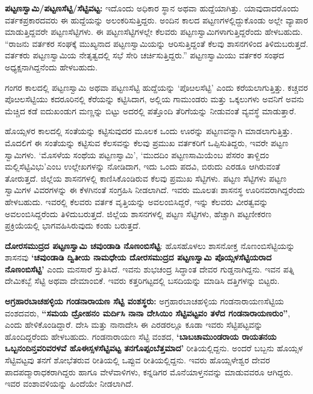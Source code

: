 \textbf{ಪಟ್ಟಣಸ್ವಾಮಿ/ಪಟ್ಟಣಸೆಟ್ಟಿ/ಸೆಟ್ಟಿವಟ್ಟ: } ಇದೊಂದು ಅಧಿಕಾರ ಸ್ಥಾನ ಅಥವಾ ಹುದ್ದೆಯಾಗಿತ್ತು. ಯಾವುದಾದ\-ರೊಂದು ವರ್ತಕಪ್ರಕಾರದವರು ಈ ಹುದ್ದೆಯನ್ನು ಅಲಂಕರಿಸುತ್ತಿದ್ದರು. ಅಂದಿನ ಕಾಲದ ಪಟ್ಟಣಗಳಲ್ಲಿದ್ದುಕೊಂಡು ಅಲ್ಲೇ ವ್ಯಾಪಾರ ಮಾಡುತ್ತಿದ್ದವರೇ ಪಟ್ಟಣಸೆಟ್ಟಿಗಳು. ಈ ಪಟ್ಟಣಸೆಟ್ಟಿಗಳಲ್ಲೇ ಕೆಲವರು ಪಟ್ಟಣಸ್ವಾಮಿಗಳಾಗುತ್ತಿದ್ದರೆಂದು ಹೇಳಬಹುದು. “ರಾಜನು ವರ್ತಕರ ಸಂಘಕ್ಕೆ ಮುಖ್ಯನಾದ ಪಟ್ಟಣಸ್ವಾಮಿಯನ್ನು ಆರಿಸುತ್ತಿದ್ದಂತೆ ಕೆಲವು ಶಾಸನಗಳಿಂದ ತಿಳಿದುಬರುತ್ತದೆ. ವರ್ತಕರು ಪಟ್ಟಣಸ್ವಾಮಿಯ ನೇತೃತ್ವದಲ್ಲಿ ಸಭೆ ಸೇರಿ ಚರ್ಚಿಸುತ್ತಿದ್ದರು.” ಪಟ್ಟಣಸ್ವಾಮಿಯು ವರ್ತಕರ ಸಂಘದ ಅಧ್ಯಕ್ಷನಾಗಿದ್ದನೆಂದು ಹೇಳಬಹುದು.

ಗಂಗರ ಕಾಲದಲ್ಲಿ ಪಟ್ಟಣಸ್ವಾಮಿ ಅಥವಾ ಪಟ್ಟಣಸೆಟ್ಟಿ ಹುದ್ದೆಯನ್ನು ‘ಪೊೞಲಸೆಟ್ಟಿ’ ಎಂದು ಕರೆಯಲಾಗುತ್ತಿತ್ತು. ಕಚ್ಚವರ ಪೊೞಲಸೆಟ್ಟಿಯು ಕದರೂರಿನಲ್ಲಿ ಕೆರೆಯನ್ನು ಕಟ್ಟಿಸಿದಾಗ, ಅಲ್ಲಿಯ ಗಾಮುಂಡರು ಮತ್ತು ಒಕ್ಕಲುಗಳು ಅವನಿಗೆ ಅವನು ಮೆಚ್ಚಿದ ಕಡೆ ಐದುಖಂಡುಗ ಮಣ್ಣನ್ನು ಬಿಟ್ಟು ಅದರಲ್ಲಿ ಪತ್ತೊಂದಿ ತೆರಿಗೆಯನ್ನು ನೀಡುವಂತೆ ವ್ಯವಸ್ಥೆ ಮಾಡುತ್ತಾರೆ.

ಹೊಯ್ಸಳರ ಕಾಲದಲ್ಲಿ ಸಂತೆಯನ್ನು ಕಟ್ಟಿಸುವುದರ ಮೂಲಕ ಒಂದು ಊರನ್ನು ಪಟ್ಟಣವನ್ನಾಗಿ ಮಾಡಲಾಗುತ್ತಿತ್ತು. ಮೊದಲಿಗೆ ಈ ಸಂತೆಯನ್ನು ಕಟ್ಟಿಸುವ ಕೆಲಸವನ್ನು ಕೆಲವು ಪ್ರಮುಖ ವರ್ತಕರಿಗೆ ಒಪ್ಪಿಸುತಿದ್ದರು, ಇವರೇ ಪಟ್ಟಣ ಸ್ವಾಮಿಗಳು. ‘ಮೊಸಳೆಯ ಸಂಥೆಯ ಪಟ್ಟಣಸ್ವಾಮಿ’, ‘ಮುದದಿಂ ಪಟ್ಟಣಸಾಮಿಯೆಂಬ ಪೆಸರಂ ತಾಳ್ದಿದಂ ಮಲ್ಲಿಸೆಟ್ಟಿವಿಭು’ಎಂಬ ಉಲ್ಲೇಖಗಳನ್ನು ನೋಡಿದಾಗ, ಇದು ಒಂದು ಪದವಿ, ಬಿರುದು ಎರಡೂ ಆಗಿರುವಂತೆ ತೋರುತ್ತದೆ. ಜಿಲ್ಲೆಯ ಶಾಸನಗಳಲ್ಲಿ ಕಾಣಿಸಿಕೊಂಡಿರುವ ಕೆಲವು ಪ್ರಮುಖ ಸೆಟ್ಟಿಗಳು. ಪಟ್ಟಣ ಸೆಟ್ಟಿಗಳು ಪಟ್ಟಣ ಸ್ವಾಮಿಗಳ ವಿವರಗಳನ್ನು ಈ ಕೆಳಗಿನಂತೆ ಸಂಗ್ರಹಿಸಿ ನೀಡಲಾಗಿದೆ. ಇವರು ಮೂಲತಃ ಶಾಸನಸ್ಥ ಊರಿನವರಾಗಿದ್ದರೆಂದು ಹೇಳಬಹುದು. ಇವರಲ್ಲಿ ಕೆಲವರು ವರ್ತಕ ವೃತ್ತಿಯನ್ನು ಅವಲಂಬಿಸಿದ್ದರೆ, ಇನ್ನು ಕೆಲವರು ವೀರತ್ವವನ್ನು ಅವಲಂಬಿಸಿದ್ದರೆಂದು ತಿಳಿದುಬರುತ್ತದೆ. ಜಿಲ್ಲೆಯ ಶಾಸನಗಳಲ್ಲಿ ಪಟ್ಟಣ ಸೆಟ್ಟಿಗಳು, ಹೆಚ್ಚಾಗಿ ಪಟ್ಟಣೀಕರಣ ಪ್ರಕ್ರಿಯೆಯಲ್ಲಿ ಭಾಗವಹಿಸಿರುವುದು ಕಂಡು ಬರುತ್ತದೆ.

\textbf{ದೋರಸಮುದ್ರದ ಪಟ್ಟಣಸ್ವಾಮಿ ಚವುಂಡಾಡಿ ನೊಣಂಬಿಸೆಟ್ಟಿ}: ಹೊಸಹೊಳಲು ಶಾಸನೋಕ್ತ ನೊಣಂಬಿಸೆಟ್ಟಿಯನ್ನು ಶಾಸನವು \textbf{‘ಚವುಂಡಾಡಿ ದ್ವಿತೀಯ ನಾಮಧೇಯ ದೋರಸಮುದ್ರದ ಪಟ್ಟಣಸ್ವಾಮಿ ಪೊಯ್ಸಳಸೆಟ್ಟಿಯರಾದ ನೊಣಂಬಿಸೆಟ್ಟಿ’} ಎಂದು ಮನಸಾರೆ ಸ್ತುತಿಸಿದೆ. ಇವನು ಶುಭಚಂದ್ರ ಸಿದ್ಧಾಂತ ದೇವರ ಗುಡ್ಡನಾಗಿದ್ದನು. ಇವನ ಪತ್ನಿ ದೇಮಿಕಬ್ಬೆ ಸೆಟ್ಟಿ ಅಥವಾ ದೇಮಾಂಬಿಕೆ. ಇವರು ಕತ್ತರಿಗಟ್ಟದಲ್ಲಿ ಬಸದಿಯನ್ನು ಮಾಡಿಸಿ ದತ್ತಿಗಳನ್ನು ಬಿಟ್ಟರು.

\textbf{ಅಗ್ರಹಾರಬಾಚಹಳ್ಳಿಯ ಗಂಡನಾರಾಯಣ ಸೆಟ್ಟಿ ವಂಶಸ್ಥರು: } ಅಗ್ರಹಾರಬಾಚಹಳ್ಳಿಯ ಗಂಡನಾರಾಯಣಸೆಟ್ಟಿಯ ವಂಶದವರು, \textbf{“ಸಮಯ ದ್ರೋಹನಂ ಮರ್ದಿಸಿ ನಾನಾ ದೇಸಿಯಿಂ ಸೆಟ್ಟಿವಟ್ಟವಂ ತಳೆದ ಗಂಡನಾರಾಯಣರುಂ”}, ಎಂದು ಹೇಳಿಕೊಂಡಿದ್ದಾರೆ. ದೇಸಿ ಮತ್ತು ನಾನಾದೇಸಿ ಈ ಎರಡರಲ್ಲೂ ಕೂಡಾ ಇವರು ಸೆಟ್ಟಿಪಟ್ಟವನ್ನು ಹೊಂದಿದ್ದರೆಂದು ಹೇಳಬಹುದು. ಗಂಡನಾರಾಯಣ ಸೆಟ್ಟಿ ವಂಶದ, \textbf{‘ಬಾಬಚಾಮುಂಡರಾಯ ರಾಯತನಯ ಒಬ್ಬನಂದಿನ್ತವರಿವರಳವೆ ಹೊಈಸ್ಸಳಸೆಟ್ಟಿವಟ್ಟ ತನಗೊಪ್ಪಂಬೆತ್ತಮಾದ’} ರೀತಿಯಲ್ಲಿದ್ದನು. ಅಂದರೆ ಬಬ್ಬನು ಹೊಯ್ಸಳ ಸೆಟ್ಟಿವಟ್ಟವು ತನಗೆ ಶೋಭೆತರುವ ರೀತಿಯಲ್ಲಿ ಒಪ್ಪುವ ರೀತಿಯಲ್ಲಿದ್ದನು. ಇವರು ಹೊಯ್ಸಳೇಶ್ವರ ದೇವರ ಪಾದಪದ್ಮಾರಾಧಕರಾಗಿದ್ದರು ಹಾಗೂ ವೇಳೆವಾಳಿಗಳು, ಕನ್ನಡಿಗರ ಮೊನೆಯಾಳ್ತನವನ್ನು ಮಾಡುವವರೂ ಆಗಿದ್ದರು. ಇವರ ವಂಶಾವಳಿಯನ್ನು ಹಿಂದೆಯೇ ನೀಡಲಾಗಿದೆ.

